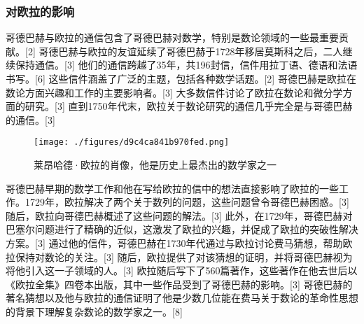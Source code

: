 \subsubsection{对欧拉的影响} 
哥德巴赫与欧拉的通信包含了哥德巴赫对数学，特别是数论领域的一些最重要贡献。[2] 哥德巴赫与欧拉的友谊延续了哥德巴赫于1728年移居莫斯科之后，二人继续保持通信。[3] 他们的通信跨越了35年，共196封信，信件用拉丁语、德语和法语书写。[6] 这些信件涵盖了广泛的主题，包括各种数学话题。[2] 哥德巴赫是欧拉在数论方面兴趣和工作的主要影响者。[3] 大多数信件讨论了欧拉在数论和微分学方面的研究。[3] 直到1750年代末，欧拉关于数论研究的通信几乎完全是与哥德巴赫的通信。[3]
\begin{figure}[ht]
\centering
\texttt{[image: ./figures/d9c4ca841b970fed.png]}
\caption{莱昂哈德·欧拉的肖像，他是历史上最杰出的数学家之一} \label{fig_Goldba_3}
\end{figure}
哥德巴赫早期的数学工作和他在写给欧拉的信中的想法直接影响了欧拉的一些工作。1729年，欧拉解决了两个关于数列的问题，这些问题曾令哥德巴赫困惑。[3] 随后，欧拉向哥德巴赫概述了这些问题的解法。[3] 此外，在1729年，哥德巴赫对巴塞尔问题进行了精确的近似，这激发了欧拉的兴趣，并促成了欧拉的突破性解决方案。[3] 通过他的信件，哥德巴赫在1730年代通过与欧拉讨论费马猜想，帮助欧拉保持对数论的关注。[3] 随后，欧拉提供了对该猜想的证明，并将哥德巴赫视为将他引入这一子领域的人。[3] 欧拉随后写下了560篇著作，这些著作在他去世后以《欧拉全集》四卷本出版，其中一些作品受到了哥德巴赫的影响。[3] 哥德巴赫的著名猜想以及他与欧拉的通信证明了他是少数几位能在费马关于数论的革命性思想的背景下理解复杂数论的数学家之一。[8]
